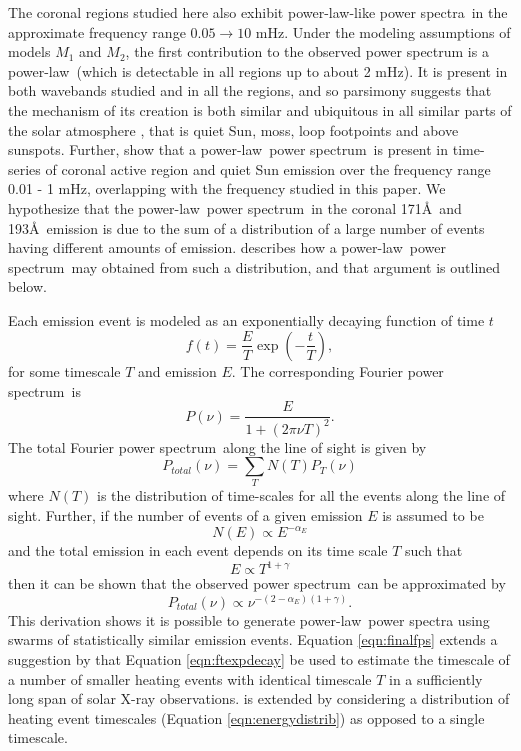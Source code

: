 \documentclass[onecolumn]{emulateapj}
\newcommand{\PS}{power spectrum}
\newcommand{\PA}{power spectra}
\newcommand{\PL}{power-law}
\newcommand{\Fps}{Fourier \PS}
\newcommand{\BF}{ }
\begin{document}
{\BF The coronal regions studied here also exhibit \PL-like \PA\ in the
approximate frequency range $0.05\rightarrow 10$ mHz.  Under the
modeling assumptions of models $M_{1}$ and $M_{2}$, the first
contribution to the observed power spectrum is a \PL\ (which is
detectable in all regions up to about 2 mHz)}.  It is present in both
wavebands studied and in all the regions, and so parsimony suggests
that the mechanism of its creation is both similar and ubiquitous in
all {\BF similar} parts of the solar atmosphere {\BF , that is quiet
  Sun, moss, loop footpoints and above sunspots}.  Further,
\cite{2014AA...563A...8A} show that a \PL\ \PS\ is present in
time-series of coronal active region and quiet Sun emission over the
frequency range 0.01 - 1 mHz, overlapping with the frequency studied
in this paper.  We hypothesize that the \PL\ \PS\ in the coronal
171\AA\ and 193\AA\ emission is due to the sum of a distribution of a
large number of events having different amounts of emission.
\cite{2011soca.book.....A} describes how a \PL\ \PS\ may obtained from
such a distribution, and that argument is outlined below.

Each emission event is modeled as an exponentially decaying function
of time $t$
\begin{equation}
\label{eqn:expdecay}
f(t) = \frac{E}{T}\exp\left(-\frac{t}{T}\right),
\end{equation}
for some timescale $T$ and emission $E$.  The corresponding \Fps\ is
\begin{equation}
\label{eqn:ftexpdecay}
P(\nu) = \frac{E}{1 + (2\pi \nu T)^{2}}.
\end{equation}
The total \Fps\ along the line of sight is given by
\begin{equation}
\label{eqn:sumftexpdecay}
P_{total}(\nu) = \sum_{T}N(T)P_{T}(\nu)
\end{equation}
where $N(T)$ is the distribution of time-scales for all the events
along the line of sight.  Further, if the number of events of a given
emission $E$ is assumed to be
\begin{equation}
\label{eqn:energydistrib}
N(E) \propto E^{-\alpha_{E}}
\end{equation}
and the total emission in each event depends on its time scale $T$
such that
\begin{equation}
\label{eqn:energytime}
E \propto T^{1+\gamma}
\end{equation}
then it can be shown that the observed \PS\ can be
approximated by
\begin{equation}
\label{eqn:finalfps}
P_{total}(\nu) \propto \nu^{-(2-\alpha_{E})(1+\gamma)}.
\end{equation}
This derivation shows it is possible to generate \PL\ power spectra
using swarms of statistically similar emission events.  {\BF Equation
  \ref{eqn:finalfps} extends a suggestion by
  \citet{1991SoPh..133..357H} that Equation \ref{eqn:ftexpdecay} be
  used to estimate the timescale of a number of smaller heating events
  with identical timescale $T$ in a sufficiently long span of solar
  X-ray observations. \citet{1991SoPh..133..357H} is extended by
  considering a distribution of heating event timescales (Equation
  \ref{eqn:energydistrib}) as opposed to a single timescale.}
\end{document}
